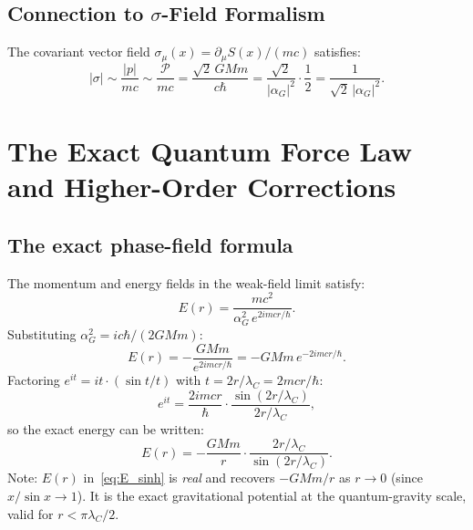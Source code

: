 \documentclass[11pt,a4paper]{article}
\theoremstyle{definition}
\theoremstyle{remark}
\begin{document}
	\subsection{Connection to $\sigma$-Field Formalism}
	
	The covariant vector field $\sigma_\mu(x)=\partial_\mu S(x)/(mc)$ satisfies:
	\begin{equation}
		|\sigma| \sim \frac{|p|}{mc} \sim \frac{\mathcal{P}}{mc} = \frac{\sqrt{2}\,GMm}{c\hbar} = \frac{\sqrt{2}}{|\alpha_G|^2}\cdot\frac{1}{2} = \frac{1}{\sqrt{2}\,|\alpha_G|^2}.
	\end{equation}
	
	\section{The Exact Quantum Force Law and Higher-Order Corrections}
	\label{sec:UV_identification}

	\subsection{The exact phase-field formula}

	The momentum and energy fields in the weak-field limit satisfy:
	\begin{equation}
		E(r) = \frac{mc^2}{\alpha_G^2\,e^{2imcr/\hbar}}.
		\label{eq:E_phase}
	\end{equation}
	Substituting $\alpha_G^2 = ic\hbar/(2GMm)$:
	\begin{equation}
		\boxed{E(r) = -\frac{GMm}{e^{2imcr/\hbar}} = -GMm\,e^{-2imcr/\hbar}.}
		\label{eq:E_exact_exp}
	\end{equation}
	Factoring $e^{it} = it\cdot(\sin t/t)$ with $t = 2r/\lambda_C = 2mcr/\hbar$:
	\begin{equation}
		e^{it} = \frac{2imcr}{\hbar}\cdot\frac{\sin(2r/\lambda_C)}{2r/\lambda_C},
	\end{equation}
	so the exact energy can be written:
	\begin{equation}
		\boxed{E(r) = -\frac{GMm}{r}\cdot\frac{2r/\lambda_C}{\sin(2r/\lambda_C)}.}
		\label{eq:E_sinh}
	\end{equation}
	Note: $E(r)$ in~\eqref{eq:E_sinh} is \emph{real} and recovers $-GMm/r$
	as $r\to0$ (since $x/\sin x\to1$). It is the exact gravitational potential
	at the quantum-gravity scale, valid for $r < \pi\lambda_C/2$.
\end{document}
